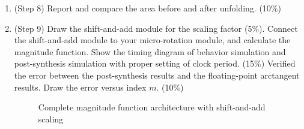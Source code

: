 \documentclass{article}
\begin{document}
\begin{enumerate}
    \begin{figure}[htbp]
        \centering
        \caption{Block diagram of the $\frac{S}{2}$-unfolding architecture}
        \label{fig:unfolding_arch}
    \end{figure}

    \begin{figure}[htbp]
        \centering
        \caption{Timing diagram of behavior simulation with 10 inputs}
        \label{fig:timing_behav_10inputs}
    \end{figure}

    \begin{figure}[htbp]
        \centering
        \caption{Timing diagram of post-synthesis simulation with 10 inputs}
        \label{fig:timing_postsyn_10inputs}
    \end{figure}

    \begin{figure}[htbp]
        \centering
        \caption{Phase error versus index $m$ for $\frac{S}{2}$-unfolding architecture (post-synthesis)}
        \label{fig:error_vs_m_postsyn}
    \end{figure}

    \newpage
    \item (Step 8) Report and compare the area before and after unfolding. (10\%)

    \newpage
    \item (Step 9) Draw the shift-and-add module for the scaling factor (5\%). Connect the shift-and-add module to your micro-rotation module, and calculate the magnitude function. Show the timing diagram of behavior simulation and post-synthesis simulation with proper setting of clock period. (15\%) Verified the error between the post-synthesis results and the floating-point arctangent results. Draw the error versus index $m$. (10\%)

    \begin{figure}[htbp]
        \centering
        \caption{Complete magnitude function architecture with shift-and-add scaling}
        \label{fig:magnitude_arch}
    \end{figure}


\end{enumerate}
\end{document}

